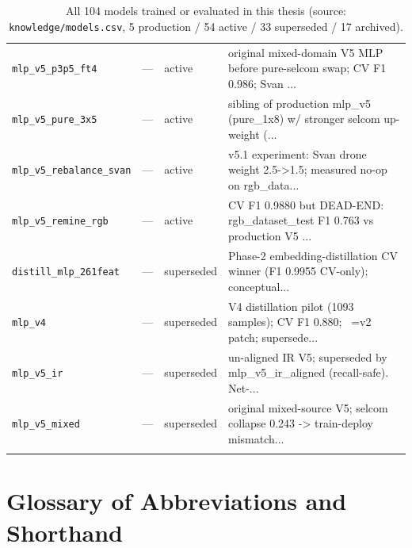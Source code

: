 \begin{longtable}{p{}llp{}}
\texttt{mlp\_v5\_p3p5\_ft4} & --- & active & original mixed-domain V5 MLP before pure-selcom swap; CV F1 0.986; Svan ... \\
\texttt{mlp\_v5\_pure\_3x5} & --- & active & sibling of production mlp\_v5 (pure\_1x8) w/ stronger selcom up-weight (... \\
\texttt{mlp\_v5\_rebalance\_svan} & --- & active & v5.1 experiment: Svan drone weight 2.5->1.5; measured no-op on rgb\_data... \\
\texttt{mlp\_v5\_remine\_rgb} & --- & active & CV F1 0.9880 but DEAD-END: rgb\_dataset\_test F1 0.763 vs production V5 ... \\
\texttt{distill\_mlp\_261feat} & --- & superseded & Phase-2 embedding-distillation CV winner (F1 0.9955 CV-only); conceptual... \\
\texttt{mlp\_v4} & --- & superseded & V4 distillation pilot (1093 samples); CV F1 0.880; ~=v2 patch; supersede... \\
\texttt{mlp\_v5\_ir} & --- & superseded & un-aligned IR V5; superseded by mlp\_v5\_ir\_aligned (recall-safe). Net-... \\
\texttt{mlp\_v5\_mixed} & --- & superseded & original mixed-source V5; selcom collapse 0.243 -> train-deploy mismatch... \\
\midrule
\bottomrule
\caption{All 104 models trained or evaluated in this thesis (source: \texttt{knowledge/models.csv}, 5 production / 54 active / 33 superseded / 17 archived).}
\label{tab:models_evaluated}
\end{longtable}
\normalsize


\chapter{Glossary of Abbreviations and Shorthand}
\label{app:glossary}

